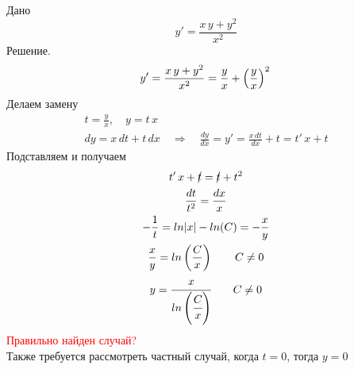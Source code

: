 \begin{Example}
    Дано
    \[
        y' = \frac{x\,y + y^2}{x^2}
    \]
    Решение.
    \[
        y' = \frac{x\,y + y^2}{x^2} = \frac{y}{x} + \left(\frac{y}{x}\right)^2\\
    \]
    Делаем замену
    \begin{gather*}
            t = \frac{y}{x}, \quad y = t\,x\\ 
            dy = x\,dt + t\,dx \quad \Rightarrow \quad \frac{dy}{dx} = y' = \frac{x\,dt}{dx} + t = t'\,x + t
    \end{gather*}
    Подставляем и получаем
    \begin{gather*}    
        t'\,x + \cancel{t} = \cancel{t} + t^2\\
        \frac{dt}{t^2} = \frac{dx}{x}\\
        -\frac{1}{t} = ln|x| - ln(C) = - \frac{x}{y}\\
        \frac{x}{y} = ln\left(\frac{C}{x}\right) \qquad C \neq 0\\
        y = \cfrac{x}{ln\left(\cfrac{C}{x}\right)} \qquad C \neq 0
    \end{gather*}
    \textcolor{red}{Правильно найден случай?}\\
    Также требуется рассмотреть частный случай, когда $t = 0$, тогда $y = 0$
\end{Example}

